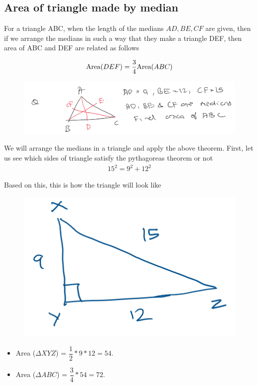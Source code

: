 \subsection{Area of triangle made by median}
For a triangle ABC, when the length of the medians $AD, BE, CF$ are given, then if we arrange the medians in such a way that they make a triangle DEF, then area of ABC and DEF are related as follows

$$
\text{Area}({DEF}) = \dfrac{3}{4} \text{Area}({ABC})
$$


\begin{figure}[h!]
    \centering
    \includegraphics[width=0.7\linewidth]{Quant//Geometry//Images//Triangles/area_of_triangle_question_1.png}
\end{figure}

We will arrange the medians in a triangle and apply the above theorem. First, let us see which sides of triangle satisfy the pythagoreas theorem or not
\begin{align*}
    15^2 = 9^2 + 12^2
\end{align*}

Based on this, this is how the triangle will look like
\begin{figure}[h!]
    \centering
    \includegraphics[width=0.5\linewidth]{Quant//Geometry//Images//Triangles/area_of_triangle_question_1_solution.png}
\end{figure}

\begin{itemize}
    \item Area ($\Delta XYZ$) = $\dfrac{1}{2} * 9 * 12 = 54$. 
    \item Area ($\Delta ABC$) = $\dfrac{3}{4} * 54 = 72$. 
\end{itemize}

